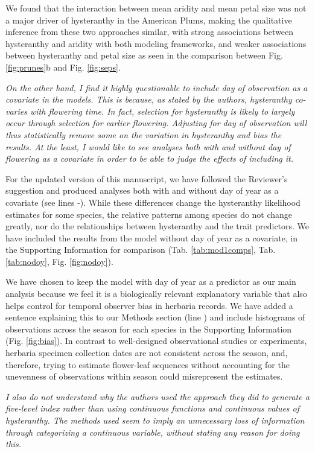 \documentclass{article}[12pt]
\begin{document}
We found that the interaction between mean aridity and mean petal size was not a major driver of hysteranthy in the American Plums, making the qualitative inference from these two approaches similar, with strong associations between hysteranthy and aridity with both modeling frameworks, and weaker associations between hysteranthy and petal size as seen in the comparison between Fig. \ref{fig:prunes}b and Fig. \ref{fig:seps}.


\emph{On the other hand, I find it highly questionable to include day of observation as a covariate in the models. This is because, as stated by the authors, hysteranthy co-varies with flowering time. In fact, selection for hysteranthy is likely to largely occur through selection for earlier flowering. Adjusting for day of observation will thus statistically remove some on the variation in hysteranthy and bias the results. At the least, I would like to see analyses both with and without day of flowering as a covariate in order to be able to judge the effects of including it.}

For the updated version of this manuscript, we  have followed the Reviewer's suggestion and produced analyses both with and without day of year as a covariate (see lines -). While these differences change the hysteranthy likelihood estimates for some species, the relative patterns among species do not change greatly, nor do the relationships between hysteranthy and the trait predictors. We have included the results from the model without day of year as a covariate, in the Supporting Information for comparison (Tab. \ref{tab:mod1comps}, Tab. \ref{tab:nodoy}, Fig. \ref{fig:nodoy}).

We have chosen to keep the model with day of year as a predictor as our main analysis because we feel it is a biologically relevant explanatory variable that also helps control for temporal observer bias in herbaria records. We have added a sentence explaining this to our Methods section (line ) and include histograms of observations across the season for each species in the Supporting Information (Fig. \ref{fig:bias}). In contrast to well-designed observational studies or experiments, herbaria specimen collection dates are not consistent across the season, and, therefore, trying to estimate flower-leaf sequences without accounting for the unevenness of observations within season could misrepresent the estimates. 

\emph{I also do not understand why the authors used the approach they did to generate a five-level index rather than using continuous functions and continuous values of hysteranthy. The methods used seem to imply an unnecessary loss of information through categorizing a continuous variable, without stating any reason for doing this.}
\end{document}
